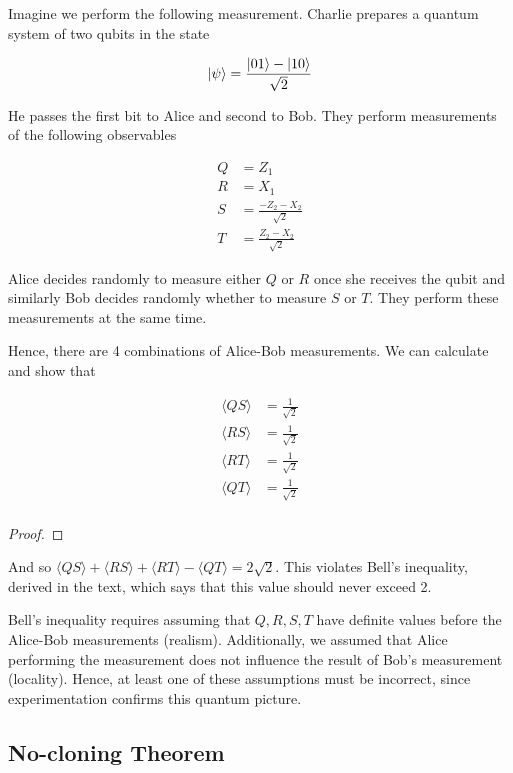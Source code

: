 \documentclass[main.tex]{subfiles}
\begin{document}
\begin{subappendices}
Imagine we perform the following measurement. Charlie prepares a quantum system of two qubits in the state

\begin{align*}
\ket{\psi} = \frac{\ket{01} - \ket{10}}{\sqrt{2}}	
\end{align*}

He passes the first bit to Alice and second to Bob. They perform measurements of the following observables

\begin{align*}
Q &= Z_1 \\
R &= X_1 \\
S &= \frac{-Z_2-X_2}{\sqrt{2}} \\
T &= \frac{Z_2 - X_2}{\sqrt{2}}	
\end{align*}

Alice decides randomly to measure either $Q$ or $R$ once she receives the qubit and similarly Bob decides randomly whether to measure $S$ or $T$. They perform these measurements at the same time.

Hence, there are 4 combinations of Alice-Bob measurements. We can calculate and show that 

\begin{align*}
\langle QS \rangle &= \frac{1}{\sqrt{2}}\\	
\langle RS \rangle &= \frac{1}{\sqrt{2}}\\	
\langle RT \rangle &= \frac{1}{\sqrt{2}}\\	
\langle QT \rangle &= \frac{1}{\sqrt{2}}\\	
\end{align*}

\begin{proof}
\end{proof}

And so $\langle QS \rangle + \langle RS \rangle + \langle RT \rangle - \langle QT \rangle = 2\sqrt{2}$. This violates Bell's inequality, derived in the text, which says that this value should never exceed 2. 

Bell's inequality requires assuming that $Q,R,S,T$ have definite values before the Alice-Bob measurements (realism). Additionally, we assumed that Alice performing the measurement does not influence the result of Bob's measurement (locality). Hence, at least one of these assumptions must be incorrect, since experimentation confirms this quantum picture.


\subsection{No-cloning Theorem}


\end{subappendices}
\end{document}
